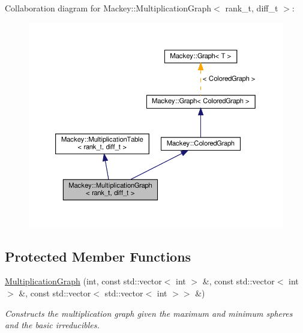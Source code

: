 Collaboration diagram for Mackey\+:\+:Multiplication\+Graph$<$ rank\+\_\+t, diff\+\_\+t $>$\+:\nopagebreak
\begin{figure}[H]
\begin{center}
\leavevmode
\includegraphics[width=350pt]{classMackey_1_1MultiplicationGraph__coll__graph}
\end{center}
\end{figure}
\subsection*{Protected Member Functions}
\begin{DoxyCompactItemize}
\item 
\hyperlink{classMackey_1_1MultiplicationGraph_a3f974791242d9e13ddca520df4265aca}{Multiplication\+Graph} (int, const std\+::vector$<$ int $>$ \&, const std\+::vector$<$ int $>$ \&, const std\+::vector$<$ std\+::vector$<$ int $>$$>$ \&)
\begin{DoxyCompactList}\small\item\em Constructs the multiplication graph given the maximum and minimum spheres and the basic irreducibles. \end{DoxyCompactList}\end{DoxyCompactItemize}
